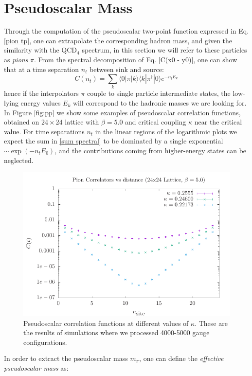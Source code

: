 \section{Pseudoscalar Mass}
Through the computation of the pseudoscalar two-point function expressed in Eq. \eqref{pion tp}, one can extrapolate the corresponding hadron mass, and given the similarity with the QCD$_4$ spectrum, in this section we will refer to these particles as \textit{pions} $\pi$.
From the spectral decomposition of Eq. \eqref{C(x0 - y0)}, one can show that at a time separation $n_t$ between sink and source:
\begin{equation}\label{sum spectral}
    C(n_t) = \sum_k \langle 0 | \pi | k \rangle \langle k | \pi^\dagger | 0 \rangle e^{-n_t E_k}
\end{equation}
hence if the interpolators $\pi$ couple to single particle intermediate states, the low-lying energy values $E_k$ will correspond to the hadronic masses we are looking for.
\\ In Figure \eqref{fig:pp} we show some examples of pseudoscalar correlation functions, obtained on $24 \times 24$ lattice with $\beta = 5.0$ and critical coupling $\kappa$ near the critical value. For time separations $n_t$ in the linear regions of the logarithmic plots we expect the sum in \eqref{sum spectral} to be dominated by a single exponential $\sim \exp(-n_t E_0)$, and the contributions coming from higher-energy states can be neglected.
\begin{figure}
    \centering
    \includegraphics[width=0.7\linewidth]{images/pp.pdf}
    \caption{Pseudoscalar correlation functions at different values of $\kappa$. These are the results of simulations where we processed 4000-5000 gauge configurations.}
    \label{fig:pp}
\end{figure}
In order to extract the pseudoscalar mass $m_{\pi}$, one can define the \textit{effective pseudoscalar mass} as:
